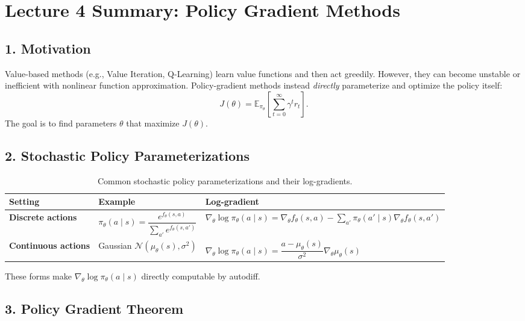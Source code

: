 \documentclass[12pt]{article}
\begin{document}
\psetheader %

\section*{Lecture 4 Summary: Policy Gradient Methods}

\subsection*{1. Motivation}

Value-based methods (e.g., Value Iteration, Q-Learning) learn value functions and then act greedily.
However, they can become unstable or inefficient with nonlinear function approximation.
Policy-gradient methods instead \emph{directly} parameterize and optimize the policy itself:
\[
		J(\theta) = \mathbb{E}_{\pi_\theta}\!\left[ \sum_{t=0}^{\infty} \gamma^t r_t \right].
\]
The goal is to find parameters $\theta$ that maximize $J(\theta)$.

\subsection*{2. Stochastic Policy Parameterizations}

\begin{table}[h!]
		\centering
		\footnotesize
		\begin{tabular}{@{}p{2.8cm}p{5.3cm}p{6.5cm}@{}}
				\hline
				\textbf{Setting} & \textbf{Example} & \textbf{Log-gradient} \\
				\hline
				\textbf{Discrete actions} &
				$\pi_\theta(a\mid s)=\dfrac{e^{f_\theta(s,a)}}{\sum_{a'} e^{f_\theta(s,a')}}$ &
				$\nabla_\theta \log \pi_\theta(a\mid s)=\nabla_\theta f_\theta(s,a)
				-\sum_{a'}\pi_\theta(a'\mid s)\nabla_\theta f_\theta(s,a')$ \\[0.8em]
				\textbf{Continuous actions} &
				Gaussian $\mathcal{N}(\mu_\theta(s),\sigma^2)$ &
				$\nabla_\theta \log \pi_\theta(a\mid s)=
				\dfrac{a-\mu_\theta(s)}{\sigma^2}\nabla_\theta\mu_\theta(s)$ \\
				\hline
		\end{tabular}
		\caption{Common stochastic policy parameterizations and their log-gradients.}
\end{table}

These forms make $\nabla_\theta \log \pi_\theta(a\mid s)$ directly computable by autodiff.

\subsection*{3. Policy Gradient Theorem}
\end{document}
